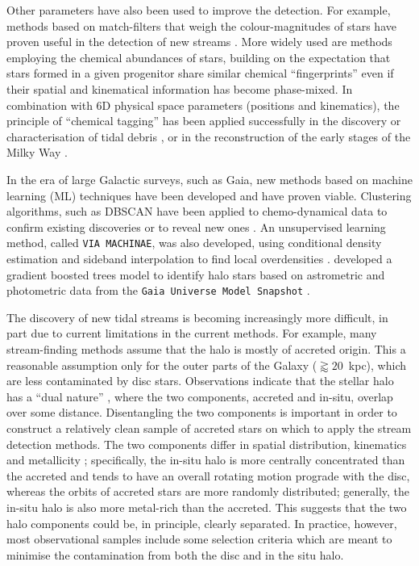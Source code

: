 Other parameters have also been used to improve the detection. For example, methods based on match-filters that weigh the colour-magnitudes of stars \citep{Grillmair1995,Rockosi2002,Balbinot2011} have proven useful in the detection of new streams \citep{Shipp2019}.  More widely used are methods employing the chemical abundances of stars, building on the expectation that stars formed in a given progenitor share similar chemical ``fingerprints'' even if their spatial and kinematical information has become phase-mixed. In combination with 6D physical space parameters (positions and kinematics), the principle of ``chemical tagging'' \citep{Freeman2002} has been applied successfully in the discovery or characterisation of tidal debris \citep{Helmi2018,Belokurov2018,Koppelman2019,Kruijssen2019b,Das2020,Ji2020,Naidu2022,Horta2023,Malhan2024}, or in the reconstruction of the early stages of the Milky Way \citep{Belokurov2023a}.

In the era of large Galactic surveys, such as Gaia,  new methods based on machine learning (ML) techniques have been developed and have proven viable. Clustering algorithms, such as DBSCAN \citep{Ester1996} have been applied to chemo-dynamical data to confirm existing discoveries or to reveal new ones  \citep{Koppelman2019,Borsato2020}. An unsupervised learning method, called \texttt{VIA MACHINAE}, was also developed, using conditional density estimation and sideband interpolation to find local overdensities \citep{Shih2022}.
\citet{Veljanoski2019} developed a gradient boosted trees model to identify halo stars based on astrometric and photometric data from the \texttt{Gaia Universe Model Snapshot} \citep{Robin2012}.

The discovery of new tidal streams is becoming increasingly more difficult, in part due to current limitations in the current methods. For example, many stream-finding methods assume that the halo is mostly of accreted origin. This a reasonable assumption only for the outer parts of the Galaxy ($\gtrapprox 20$~kpc), which are less contaminated by disc stars. Observations indicate that the stellar halo has a ``dual nature'' \citep{Carollo2007,Carollo2010,Beers2012}, where the two components, accreted and in-situ, overlap over some distance. Disentangling the two components is important in order to construct a relatively clean sample of accreted stars on which to apply the stream detection methods. The two components differ in spatial distribution, kinematics and metallicity \citep{Carollo2007}; specifically, the in-situ halo is more centrally concentrated than the accreted and tends to have an overall rotating motion prograde with the disc, whereas the orbits of accreted stars are more randomly distributed; generally, the in-situ halo is also more metal-rich than the accreted. This suggests that the two halo components could be, in principle, clearly separated. In practice, however, most observational samples include some selection criteria which are meant to minimise the contamination from both the disc and in the situ halo.


